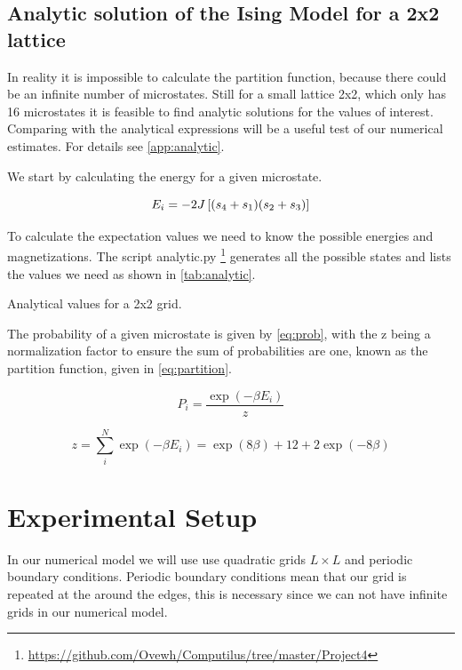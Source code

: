 \subsection{Analytic solution of the Ising Model for a 2x2 lattice}
In reality it is impossible to calculate the partition function, because there
could be an infinite number of microstates. Still for a small lattice 2x2, which
only has 16 microstates it is
feasible to find analytic solutions for the values of
interest. Comparing with the analytical expressions will be a useful test of our
numerical estimates. For details see \cref{app:analytic}.

We start by calculating the energy for a given microstate.

\begin{equation}
  E_i = -2J\left[(s_4 + s_1)(s_2+s_3)\right]
\end{equation}

To calculate the expectation values we need to know the possible energies and
magnetizations. The script analytic.py
\footnote{\url{https://github.com/Ovewh/Computilus/tree/master/Project4}}
generates all the possible states and lists the values we need as shown in
\cref{tab:analytic}.

\begin{table}[htp]
  \centering
  \caption{Analytical values for a 2x2 grid.}
  \label{tab:analytic}
\end{table}

The probability of a given microstate is given by \cref{eq:prob}, with the z
being a normalization factor to ensure the sum of probabilities are one, known
as the partition function, given in \cref{eq:partition}.


\begin{equation}
  \label{eq:prob}
  P_i = \frac{\exp(-\beta E_i)}{z}
\end{equation}

\begin{equation}
  \label{eq:partition}
  z = \sum_{i}^{N} \exp(-\beta E_i) = \exp(8\beta) + 12 + 2\exp(-8\beta)
\end{equation}


\section{Experimental Setup}
In our numerical model we will use  use quadratic grids $L\times L$ and
periodic boundary conditions. Periodic boundary conditions mean that our grid is
repeated at the around the edges, this is necessary since we can not have
infinite grids in our numerical model.


